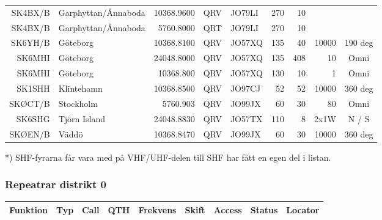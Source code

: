 \begin{landscape}
\begin{tabular}{rlrllrrrc}
SK4BX/B & Garphyttan/Ånnaboda & 10368.9600 & QRV & JO79LI & 270 & 10  &       &         \\
SK4BX/B & Garphyttan/Ånnaboda & 5760.8000  & QRT & JO79LI & 270 & 10  &       &         \\
SK6YH/B & Göteborg            & 10368.8100 & QRV & JO57XQ & 135 & 40  & 10000 & 190 deg \\
SK6MHI  & Göteborg            & 24048.8000 & QRV & JO57XQ & 135 & 408 & 10    & Omni    \\
SK6MHI  & Göteborg            & 10368.800  & QRV & JO57XQ & 130 & 10  & 1     & Omni    \\
SK1SHH  & Klintehamn          & 10368.8500 & QRV & JO97CJ & 52  & 52  & 10000 & 360 deg \\
SKØCT/B & Stockholm           & 5760.903   & QRV & JO99JX & 60  & 30  & 80    & Omni    \\
SK6SHG  & Tjörn Island        & 24048.8830 & QRV & JO57TX & 110 & 8   & 2x1W  & N / S   \\
SKØEN/B & Väddö               & 10368.8470 & QRV & JO99JX & 60  & 30  & 10000 & 360 deg \\

\end{tabular}

*) SHF-fyrarna får vara med på VHF/UHF-delen till SHF har fått en egen del i listan.

\clearpage


\subsubsection{Repeatrar distrikt 0}
\footnotesize
\begin{longtable}{llllrrlcl}
	\textbf{Funktion}  & \textbf{Typ} & \textbf{Call} & \textbf{QTH} & \textbf{Frekvens} & \textbf{Skift} & \textbf{Access} & \textbf{Status} & \textbf{Locator} \\ \hline
	\endhead


\end{longtable}
\end{landscape}
